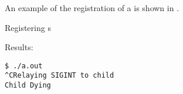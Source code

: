 An example of the registration of a  is shown in .

\begin{listing}[h!tbp]
\caption{Registering s}
\label{lst:Register_Signal_Handler}

Results:
\begin{verbatim}
$ ./a.out
^CRelaying SIGINT to child
Child Dying
\end{verbatim}
\end{listing}

